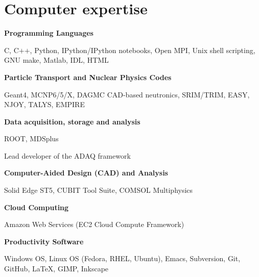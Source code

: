 \documentclass[10pt]{article}
\begin{document}
\section{Computer expertise}

\textbf{Programming Languages}
\begin{innerlist}
  \item C, C$+$$+$, Python, IPython/IPython notebooks, Open MPI, Unix shell scripting, GNU make, Matlab, IDL, HTML
\end{innerlist}

\halfblankline

\textbf{Particle Transport and Nuclear Physics Codes}
\begin{innerlist}
  \item Geant4, MCNP6/5/X, DAGMC CAD-based neutronics, SRIM/TRIM, EASY, NJOY, TALYS, EMPIRE
\end{innerlist}

\halfblankline

\textbf{Data acquisition, storage and analysis}
\begin{innerlist}
  \item ROOT, MDSplus
  \item Lead developer of the ADAQ framework
\end{innerlist}

\halfblankline

\textbf{Computer-Aided Design (CAD) and Analysis}
\begin{innerlist}
  \item Solid Edge ST5, CUBIT Tool Suite, COMSOL Multiphysics
\end{innerlist}

\halfblankline

\textbf{Cloud Computing}
\begin{innerlist}
  \item Amazon Web Services (EC2 Cloud Compute Framework)
\end{innerlist}

\halfblankline

\textbf{Productivity Software}
\begin{innerlist}
  \item Windows OS, Linux OS (Fedora, RHEL, Ubuntu), Emacs,
    Subversion, Git, GitHub, \LaTeX, GIMP, Inkscape
\end{innerlist} 

\end{document}
